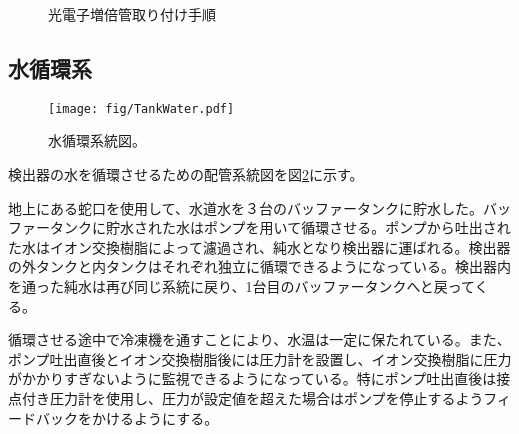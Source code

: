\documentclass[11pt]{jreport}
\newcommand{\figref}[1]{図\ref{#1}}
\begin{document}
\begin{figure}[htbp]
  \begin{minipage}{0.47\textwidth}
  \end{minipage}
  \hfill
  \begin{minipage}{0.47\textwidth}
  \end{minipage}
  \hfill
  \begin{minipage}{0.47\textwidth}
  \end{minipage}
  \hfill
  \begin{minipage}{0.47\textwidth}
  \end{minipage}
    \caption{光電子増倍管取り付け手順}
  \label{PMTAssyProcedure}
\end{figure}


\subsection{水循環系}

\begin{figure}[htbp]
\centering
\texttt{[image: fig/TankWater.pdf]}
\caption[水循環系統図]{水循環系統図。}
\label{WaterCirculation}
\end{figure}

検出器の水を循環させるための配管系統図を\figref{WaterCirculation}に示す。

地上にある蛇口を使用して、水道水を３台のバッファータンクに貯水した。バッファータンクに貯水された水はポンプを用いて循環させる。ポンプから吐出された水はイオン交換樹脂によって濾過され、純水となり検出器に運ばれる。検出器の外タンクと内タンクはそれぞれ独立に循環できるようになっている。検出器内を通った純水は再び同じ系統に戻り、1台目のバッファータンクへと戻ってくる。

循環させる途中で冷凍機を通すことにより、水温は一定に保たれている。また、ポンプ吐出直後とイオン交換樹脂後には圧力計を設置し、イオン交換樹脂に圧力がかかりすぎないように監視できるようになっている。特にポンプ吐出直後は接点付き圧力計を使用し、圧力が設定値を超えた場合はポンプを停止するようフィードバックをかけるようにする。
\end{document}
